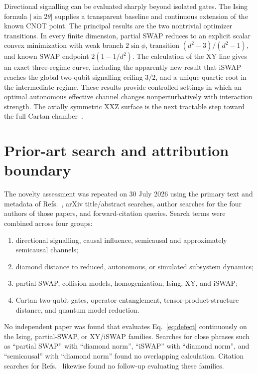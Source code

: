 \documentclass[11pt,a4paper]{article}
\theoremstyle{remark}
\begin{document}
Directional signalling can be evaluated sharply beyond isolated gates.  The
Ising formula $|\sin2\theta|$ supplies a transparent baseline and continuous
extension of the known CNOT point.  The principal results are the two
nontrivial optimizer transitions.  In every finite dimension, partial SWAP
reduces to an explicit scalar convex minimization with
weak branch $2\sin\phi$, transition
$(d^2-3)/(d^2-1)$, and known SWAP endpoint $2(1-1/d^2)$.  The calculation
of the XY line gives an exact three-regime curve, including the apparently new
result that iSWAP reaches the global two-qubit signalling ceiling $3/2$, and a
unique quartic root in the intermediate regime.  These
results provide controlled
settings in which an optimal
autonomous effective channel changes nonperturbatively with interaction
strength.  The axially symmetric XXZ surface is the next tractable step toward
the full Cartan chamber~\cite{zhang2003}.

\appendix
\section{Prior-art search and attribution boundary}
\label{app:literature}

The novelty assessment was repeated on 30 July 2026 using the primary text and
metadata of Refs.~\cite{barsse2024,barsse2025}, arXiv title/abstract searches,
author searches for the four authors of those papers, and forward-citation
queries.  Search terms were combined across four groups:
\begin{enumerate}
 \item directional signalling, causal influence, semicausal and approximately
 semicausal channels;
 \item diamond distance to reduced, autonomous, or simulated subsystem
 dynamics;
 \item partial SWAP, collision models, homogenization, Ising, XY, and iSWAP;
 \item Cartan two-qubit gates, operator entanglement, tensor-product-structure
 distance, and quantum model reduction.
\end{enumerate}
No independent paper was found that evaluates
Eq.~\eqref{eq:defect} continuously on the Ising, partial-SWAP, or XY/iSWAP
families.  Searches for close phrases such as ``partial SWAP'' with ``diamond
norm'', ``iSWAP'' with ``diamond norm'', and ``semicausal'' with ``diamond
norm'' found no overlapping calculation.  Citation searches for
Refs.~\cite{barsse2024,barsse2025} likewise found no follow-up evaluating these
families.
\end{document}
